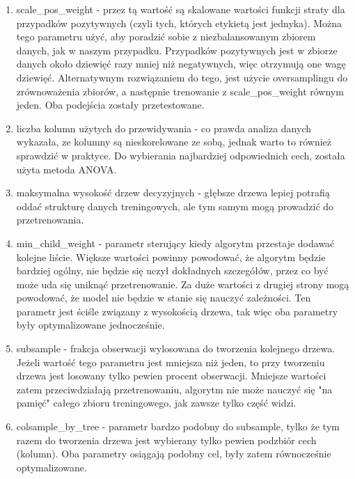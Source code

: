 \documentclass[12pt]{article}
\begin{document}
\begin{enumerate}
    \item scale\_pos\_weight - przez tą wartość są skalowane wartości funkcji straty dla przypadków pozytywnych (czyli tych, których etykietą jest jednyka). Można tego parametru użyć, aby poradzić sobie z niezbalansowanym zbiorem danych, jak w naszym przypadku. Przypadków pozytywnych jest w zbiorze danych około dziewięć razy mniej niż negatywnych, więc otrzymują one wagę dziewięć. Alternatywnym rozwiązaniem do tego, jest użycie oversamplingu do zrównoważenia zbiorów, a następnie trenowanie z scale\_pos\_weight równym jeden. Oba podejścia zostały przetestowane.
    
    \item liczba kolumn użytych do przewidywania - co prawda analiza danych wykazała, ze kolumny są nieskorelowane ze sobą, jednak warto to również sprawdzić w praktyce. Do wybierania najbardziej odpowiednich cech, została użyta metoda ANOVA.
    
    \item maksymalna wysokość drzew decyzyjnych - głębsze drzewa lepiej potrafią oddać strukturę danych treningowych, ale tym samym mogą prowadzić do przetrenowania.
    
    \item min\_child\_weight - parametr sterujący kiedy algorytm przestaje dodawać kolejne liście. Większe wartości powinny powodować, że algorytm będzie bardziej ogólny, nie będzie się uczył dokładnych szczegółów, przez co być może uda się uniknąć przetrenowanie. Za duże wartości z drugiej strony mogą powodować, że model nie będzie w stanie się nauczyć zależności. Ten parametr jest ściśle związany z wysokością drzewa, tak więc oba parametry były optymalizowane jednocześnie. 
    
    \item subsample - frakcja obserwacji wylosowana do tworzenia kolejnego drzewa. Jeżeli wartość tego parametru jest mniejsza niż jeden, to przy tworzeniu drzewa jest losowany tylko pewien procent obserwacji. Mniejsze wartości zatem przeciwdziałają przetrenowaniu, algorytm nie może nauczyć się "na pamięć" całego zbioru treningowego, jak zawsze tylko część widzi.
    
    \item colsample\_by\_tree - parametr bardzo podobny do subsample, tylko że tym razem do tworzenia drzewa jest wybierany tylko pewien podzbiór cech (kolumn). Oba parametry osiągają podobny cel, były zatem równocześnie optymalizowane.
    

\end{enumerate}
\end{document}
